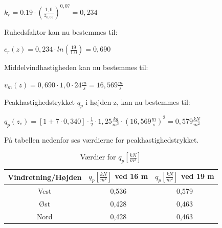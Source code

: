 \begin{center}
$k_r=0.19\cdot (\frac{1,\!0}{z_{0,\!05}})^{0,\!07}=0,\!234$
\end{center}
Ruhedsfaktor kan nu bestemmes til:
\begin{center}
$c_r(z)=0,\!234\cdot ln(\frac{19}{1.0})=0,\!690$
\end{center}
Middelvindhastigheden kan nu bestemmes til:
\begin{center}
$v_m(z)=0,\!690\cdot 1,\!0\cdot 24 \frac{m}{s}=16,\!569 \frac{m}{s}$
\end{center}
Peakhastighedstrykket $q_p$ i højden z, kan nu bestemmes til:
\begin{center}
$q_p(z_e)=[1+7\cdot 0,\!340]\cdot \frac{1}{2}\cdot 1,\!25 \frac{kg}{m^3}\cdot (16,\!569 \frac{m}{s})^2=0,\!579 \frac{kN}{m^2}$
\end{center}

På tabellen nedenfor ses værdierne for peakhastighedstrykket.
\begin{table}[htb]
\begin{center}
	\begin{tabular}{ |c|c|c| } 
		\hline
		Vindretning/Højden & $q_p [\frac{kN}{m^2}]$ ved 16 m & $q_p [\frac{kN}{m^2}]$ ved 19 m \\	\hline
		Vest & 0,536 & 0,579 \\		\hline
		Øst & 0,428 & 0,463 \\	\hline 
		Nord & 0,428 & 0,463 \\ 	\hline
	\end{tabular}
		\caption{Værdier for $q_p [\frac{kN}{m^2}]$}
		\label{tab:peak}
\end{center}
\end{table}

